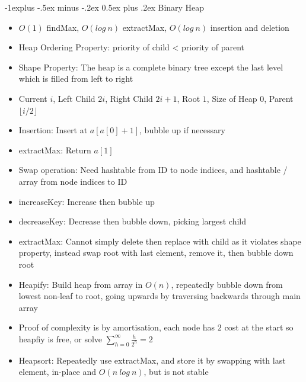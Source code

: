 \documentclass[10pt, landscape]{article}
\makeatletter
\renewcommand{\section}{\@startsection{section}{1}{0mm}%
                                {-1ex plus -.5ex minus -.2ex}%
                                {0.5ex plus .2ex}%
                                {\normalfont\large\bfseries}}
\renewcommand{\section}{\@startsection{section}{2}{0mm}%
                                {-1explus -.5ex minus -.2ex}%
                                {0.5ex plus .2ex}%
                                {\normalfont\normalsize\bfseries}}
\makeatother
\begin{document}
\begin{multicols*}{4}
\section{Binary Heap}
\begin{itemize}
    \item $O(1)$ findMax, $O(log \ n)$ extractMax, $O(log \ n)$ insertion and deletion
    \item Heap Ordering Property: priority of child < priority of parent
    \item Shape Property: The heap is a complete binary tree except the last level which is filled from left to right
    \item Current $i$, Left Child $2i$, Right Child $2i+1$, Root $1$, Size of Heap $0$, Parent $\lfloor i/2 \rfloor$
    \item Insertion: Insert at $a[a[0]+1]$, bubble up if necessary
    \item extractMax: Return $a[1]$
    \item Swap operation: Need hashtable from ID to node indices, and hashtable / array from node indices to ID
    \item increaseKey: Increase then bubble up
    \item decreaseKey: Decrease then bubble down, picking largest child
    \item extractMax: Cannot simply delete then replace with child as it violates shape property, instead swap root with last element, remove it, then bubble down root
    \item Heapify: Build heap from array in $O(n)$, repeatedly bubble down from lowest non-leaf to root, going upwards by traversing backwards through main array
    \item Proof of complexity is by amortisation, each node has $2$ cost at the start so heapfiy is free, or solve $\sum_{h=0}^\infty \frac{h}{2^h}=2$
    \item Heapsort: Repeatedly use extractMax, and store it by swapping with last element, in-place and $O(n \ log \ n)$, but is not stable
\end{itemize}


\end{multicols*}
\end{document}
